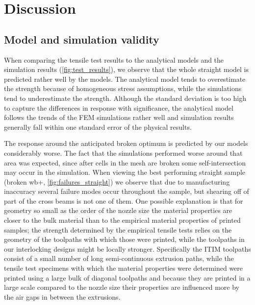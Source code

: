\section{Discussion}
\subsection{Model and simulation validity}

When comparing the tensile test results to the analytical models and the simulation results (\cref{fig:test_results}),
we observe that the whole straight model is predicted rather well by the models.
The analytical model tends to overestimate the strength because of homogeneous stress assumptions,
while the simulations tend to underestimate the strength.
Although the standard deviation is too high to capture the differences in response with significance,
the analytical model follows the trends of the FEM simulations rather well and simulation results generally fall within one standard error of the physical results.

The response around the anticipated broken optimum is predicted by our models considerably worse.
The fact that the simulations performed worse around that area was expected, since after cells in the mesh are broken some self-intersection may occur in the simulation.
When viewing the best performing straight sample (broken wb+, \cref{fig:failures_straight}) we observe that due to manufacturing inaccuracy several failure modes occur throughout the sample,
but shearing off of part of the cross beams is not one of them.
One possible explanation is that for geometry so small as the order of the nozzle size the material properties are closer to the bulk material than to the empirical material properties of printed samples;
the strength determined by the empirical tensile tests relies on the geometry of the toolpaths with which those were printed, while the toolpaths in our interlocking designs might be locally stronger.
Specifically the ITIM toolpaths consist of a small number of long semi-continuous extrusion paths, while %
the tensile test specimens with which the material properties were determined were printed using a large bulk of diagonal toolpaths
and because they are printed in a large scale compared to the nozzle size their properties are influenced more by the air gaps in between the extrusions.

